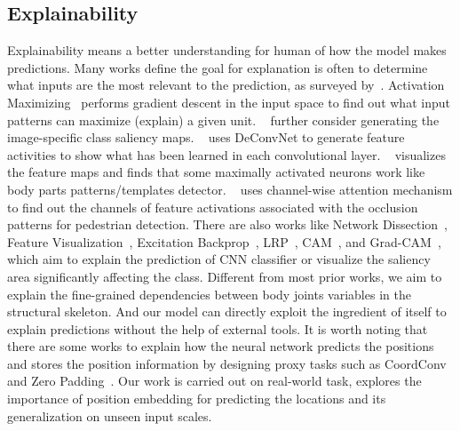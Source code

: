 \documentclass{article}
\begin{document}
\subsection{Explainability}
Explainability means a better understanding for human of how the model makes predictions. Many works define the goal for explanation is often to determine what inputs are the most relevant to the prediction, as surveyed by~\cite{samek2019explainable}. Activation Maximizing~\cite{erhan2009visualizing, li2015heterogeneous} performs gradient descent in the input space to find out what input patterns can maximize (explain) a given unit. ~\cite{simonyan2013deep, fang2017rmpe} further consider generating the image-specific class saliency maps. ~\cite{zeiler2014visualizing} uses DeConvNet to generate feature activities to show what has been learned in each convolutional layer. ~\cite{li2015heterogeneous} visualizes the feature maps and finds that some maximally activated neurons work like body parts patterns/templates detector. ~\cite{zhang2018occluded} uses channel-wise attention mechanism to find out the channels of feature activations associated with the occlusion patterns for pedestrian detection. There are also works like Network Dissection~\cite{bau2017network}, Feature Visualization~\cite{olah2017feature}, Excitation Backprop~\cite{zhang2016top}, LRP~\cite{bach2015pixel}, CAM~\cite{zhou2016learning}, and Grad-CAM~\cite{selvaraju2017grad}, which aim to explain the prediction of CNN classifier or visualize the saliency area significantly affecting the class. Different from most prior works, we aim to explain the fine-grained dependencies between body joints variables in the structural skeleton. And our model can directly exploit the ingredient of itself to explain predictions without the help of external tools. It is worth noting that there are some works to explain how the neural network predicts the positions and stores the position information by designing proxy tasks such as CoordConv~\cite{liu2018an} and Zero Padding~\cite{islam2020how}. Our work is carried out on real-world task, explores the importance of position embedding for predicting the locations and its generalization on unseen input scales.
\end{document}

